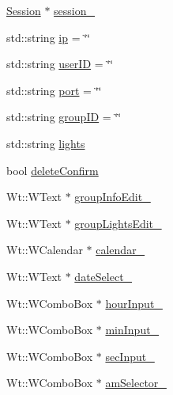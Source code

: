 \begin{DoxyCompactItemize}
\item 
\hyperlink{classSession}{Session} $\ast$ \hyperlink{classGroupsSchedulerControlWidget_a3deffc645d7f353f13f92d24c65618e0}{session\+\_\+}
\item 
std\+::string \hyperlink{classGroupsSchedulerControlWidget_a2ff34606703956500d57360cef9833c4}{ip} = \char`\"{}\char`\"{}
\item 
std\+::string \hyperlink{classGroupsSchedulerControlWidget_a5973c1e905540b541584f3fd7057432e}{user\+ID} = \char`\"{}\char`\"{}
\item 
std\+::string \hyperlink{classGroupsSchedulerControlWidget_ab6667e25970ca796cf01b6053d8ba9c0}{port} = \char`\"{}\char`\"{}
\item 
std\+::string \hyperlink{classGroupsSchedulerControlWidget_adeedcd4b282fa78d96ca7f0943264e4f}{group\+ID} = \char`\"{}\char`\"{}
\item 
std\+::string \hyperlink{classGroupsSchedulerControlWidget_aabfd4696b14e8e2c8e2c686e9f4063ab}{lights}
\item 
bool \hyperlink{classGroupsSchedulerControlWidget_a1ab13d530dbc0caf8a3e2109b92bddd8}{delete\+Confirm}
\item 
Wt\+::\+W\+Text $\ast$ \hyperlink{classGroupsSchedulerControlWidget_a0827354cfd4577368e24031e767b3e3e}{group\+Info\+Edit\+\_\+}
\item 
Wt\+::\+W\+Text $\ast$ \hyperlink{classGroupsSchedulerControlWidget_aff559cf8e50960c10a424805c8b54c08}{group\+Lights\+Edit\+\_\+}
\item 
Wt\+::\+W\+Calendar $\ast$ \hyperlink{classGroupsSchedulerControlWidget_af96ad1c81859c805e032e12b9c5df0bd}{calendar\+\_\+}
\item 
Wt\+::\+W\+Text $\ast$ \hyperlink{classGroupsSchedulerControlWidget_a88b3bbe815158434533ec1dfe959b443}{date\+Select\+\_\+}
\item 
Wt\+::\+W\+Combo\+Box $\ast$ \hyperlink{classGroupsSchedulerControlWidget_ab7d69eede51cc75459ea9b52148d89b3}{hour\+Input\+\_\+}
\item 
Wt\+::\+W\+Combo\+Box $\ast$ \hyperlink{classGroupsSchedulerControlWidget_a6a6fb7a92738b2fed2e052106c7f257f}{min\+Input\+\_\+}
\item 
Wt\+::\+W\+Combo\+Box $\ast$ \hyperlink{classGroupsSchedulerControlWidget_a54ea49b4871569d66a9648013fa75d29}{sec\+Input\+\_\+}
\item 
Wt\+::\+W\+Combo\+Box $\ast$ \hyperlink{classGroupsSchedulerControlWidget_a2583faf6dc680fde01f900bdec60c519}{am\+Selector\+\_\+}

\end{DoxyCompactItemize}
